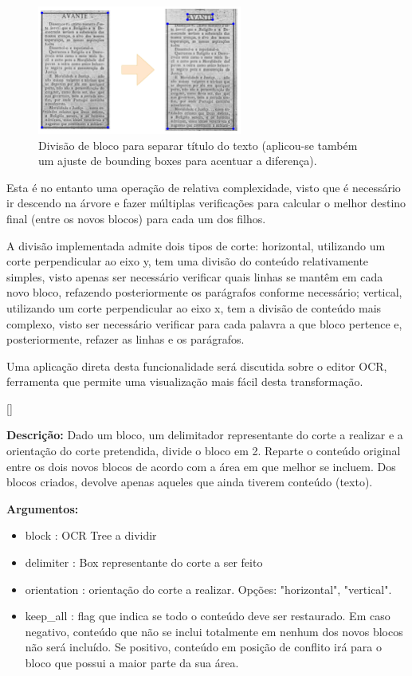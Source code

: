 \begin{figure}[H]
	\centering
	\includegraphics[width=0.6\textwidth]{images/ilustracoes/split_blocks_example.png}
	\caption{Divisão de bloco para separar título do texto (aplicou-se também um ajuste de bounding boxes para acentuar a diferença).}
	\label{fig:split_blocks_example}
\end{figure}


Esta é no entanto uma operação de relativa complexidade, visto que é necessário ir descendo na árvore e fazer múltiplas verificações para calcular o melhor destino final (entre os novos blocos) para cada um dos filhos.

A divisão implementada admite dois tipos de corte: horizontal, utilizando um corte perpendicular ao eixo y, tem uma divisão do conteúdo relativamente simples, visto apenas ser necessário verificar quais linhas se mantêm em cada novo bloco, refazendo posteriormente os parágrafos conforme necessário; vertical, utilizando um corte perpendicular ao eixo x, tem a divisão de conteúdo mais complexo, visto ser necessário verificar para cada palavra a que bloco pertence e, posteriormente, refazer as linhas e os parágrafos. 

Uma aplicação direta desta funcionalidade será discutida sobre o editor OCR, ferramenta que permite uma visualização mais fácil desta transformação.


[\normalsize]

\textbf{Descrição:} Dado um bloco, um delimitador representante do corte a realizar e a orientação do corte pretendida, divide o bloco em 2. Reparte o conteúdo original entre os dois novos blocos de acordo com a área em que melhor se incluem. Dos blocos criados, devolve apenas aqueles que ainda tiverem conteúdo (texto).

\textbf{Argumentos:}
\begin{itemize}\setlength\itemsep{-0.3em}
	\item block : OCR Tree a dividir
	\item delimiter : Box representante do corte a ser feito
	\item orientation : orientação do corte a realizar. Opções: "horizontal", "vertical".
	\item keep\_all : flag que indica se todo o conteúdo deve ser restaurado. Em caso negativo, conteúdo que não se inclui totalmente em nenhum dos novos blocos não será incluído. Se positivo, conteúdo em posição de conflito irá para o bloco que possui a maior parte da sua área.
\end{itemize}

